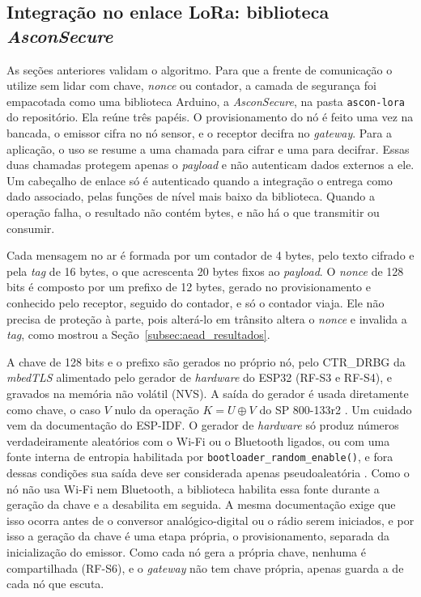 
\subsection{Integração no enlace LoRa: biblioteca \textit{AsconSecure}}
\label{subsec:asconsecure}

As seções anteriores validam o algoritmo. Para que a frente de comunicação o utilize sem lidar com chave, \textit{nonce} ou contador, a camada de segurança foi empacotada como uma biblioteca Arduino, a \textit{AsconSecure}, na pasta \texttt{ascon-lora} do repositório. Ela reúne três papéis. O provisionamento do nó é feito uma vez na bancada, o emissor cifra no nó sensor, e o receptor decifra no \textit{gateway}. Para a aplicação, o uso se resume a uma chamada para cifrar e uma para decifrar. Essas duas chamadas protegem apenas o \textit{payload} e não autenticam dados externos a ele. Um cabeçalho de enlace só é autenticado quando a integração o entrega como dado associado, pelas funções de nível mais baixo da biblioteca. Quando a operação falha, o resultado não contém bytes, e não há o que transmitir ou consumir.

Cada mensagem no ar é formada por um contador de 4 bytes, pelo texto cifrado e pela \textit{tag} de 16 bytes, o que acrescenta 20 bytes fixos ao \textit{payload}. O \textit{nonce} de 128 bits é composto por um prefixo de 12 bytes, gerado no provisionamento e conhecido pelo receptor, seguido do contador, e só o contador viaja. Ele não precisa de proteção à parte, pois alterá-lo em trânsito altera o \textit{nonce} e invalida a \textit{tag}, como mostrou a Seção~\ref{subsec:aead_resultados}.

A chave de 128 bits e o prefixo são gerados no próprio nó, pelo CTR\_DRBG da \textit{mbedTLS} alimentado pelo gerador de \textit{hardware} do ESP32 (RF-S3 e RF-S4), e gravados na memória não volátil (NVS). A saída do gerador é usada diretamente como chave, o caso $V$ nulo da operação $K = U \oplus V$ do SP 800-133r2 \cite{barker2020nist133}. Um cuidado vem da documentação do ESP-IDF. O gerador de \textit{hardware} só produz números verdadeiramente aleatórios com o Wi-Fi ou o Bluetooth ligados, ou com uma fonte interna de entropia habilitada por \texttt{bootloader\_random\_enable()}, e fora dessas condições sua saída deve ser considerada apenas pseudoaleatória \cite{espressif2026random}. Como o nó não usa Wi-Fi nem Bluetooth, a biblioteca habilita essa fonte durante a geração da chave e a desabilita em seguida. A mesma documentação exige que isso ocorra antes de o conversor analógico-digital ou o rádio serem iniciados, e por isso a geração da chave é uma etapa própria, o provisionamento, separada da inicialização do emissor. Como cada nó gera a própria chave, nenhuma é compartilhada (RF-S6), e o \textit{gateway} não tem chave própria, apenas guarda a de cada nó que escuta.

